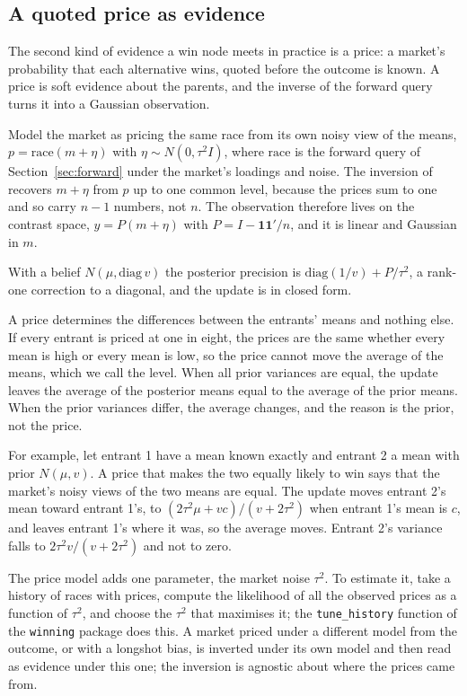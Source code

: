\documentclass[11pt]{article}
\begin{document}
\subsection{A quoted price as evidence}
\label{sec:price}

The second kind of evidence a win node meets in practice is a price:
a market's probability that each alternative wins, quoted before the
outcome is known. A price is soft evidence about the parents, and the
inverse of the forward query turns it into a Gaussian observation.

Model the market as pricing the same race from its own noisy view of
the means, $p=\mathrm{race}(m+\eta)$ with $\eta\sim N(0,\tau^2 I)$,
where $\mathrm{race}$ is the forward query of
Section~\ref{sec:forward} under the market's loadings and noise. The
inversion of \citet[\S5]{cotton2026} recovers $m+\eta$ from $p$ up to
one common level, because the prices sum to one and so carry $n-1$
numbers, not $n$. The observation therefore lives on the
contrast space, $y=P(m+\eta)$ with $P=I-\mathbf{1}\mathbf{1}'/n$,
and it is linear and Gaussian in $m$.

With a belief $N(\mu,\mathrm{diag}\,v)$ the
posterior precision is $\mathrm{diag}(1/v)+P/\tau^2$, a rank-one
correction to a diagonal, and the update is in closed form.

A price determines the differences between the entrants' means and
nothing else. If every entrant is priced at one in eight, the prices
are the same whether every mean is high or every mean is low, so the
price cannot move the average of the means, which we call the level.
When all prior variances are equal, the update leaves the average of
the posterior means equal to the average of the prior means. When the
prior variances differ, the average changes, and the reason is the
prior, not the price.

For example, let entrant 1 have a mean known
exactly and entrant 2 a mean with prior $N(\mu,v)$. A price that makes
the two equally likely to win says that the market's noisy views of
the two means are equal. The update moves entrant 2's mean toward
entrant 1's, to $(2\tau^2\mu+vc)/(v+2\tau^2)$ when entrant 1's mean is
$c$, and leaves entrant 1's where it was, so the average moves. Entrant
2's variance falls to $2\tau^2v/(v+2\tau^2)$ and not to zero.

The price model adds one parameter, the market noise $\tau^2$. To
estimate it, take a history of races with prices, compute the
likelihood of all the observed prices as a function of $\tau^2$, and
choose the $\tau^2$ that maximises it; the \texttt{tune\_history}
function of the \texttt{winning} package does this. A market priced
under a different model from the outcome, or with a longshot bias, is
inverted under its own model and then read as evidence under this
one; the inversion is agnostic about where the prices came from.
\end{document}
